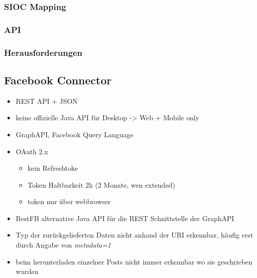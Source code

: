 \subsubsection{SIOC Mapping} %
\label{ssub:moodle_sioc_mapping}

\subsubsection{API} %
\label{ssub:moolde_api}

\subsubsection{Herausforderungen} %
\label{ssub:moodle_herausforderungen}





\subsection{Facebook Connector} %
\label{sub:facebook_connector}

\begin{itemize}
    \item REST API + JSON
    \item keine offizielle Java API für Desktop -> Web + Mobile only
    \item GraphAPI, Facebook Query Language
    \item OAuth 2.x
    \begin{itemize}
        \item kein Refreshtoke
        \item Token Haltbarkeit 2h (2 Monate, wen extended)
        \item token nur über webbrowser
    \end{itemize}
    \item RestFB alternative Java API für die REST Schnittstelle der GraphAPI
    \item Typ der zurückgelieferten Daten nicht anhand der URI erkennbar, häufig erst durch Angabe von \emph{metadata=1}
    \item beim herunterladen einzelner Posts nicht immer erkennbar wo sie geschrieben wurden
\end{itemize}

